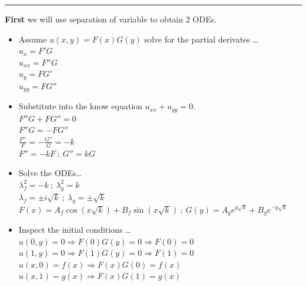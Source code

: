 \documentclass[10pt]{article}
\begin{document}
\hrule

\vspace{7.5mm}

\noindent
\textbf{First} we will use separation of variable to obtain 2 ODEs. \\

\begin{itemize}
    \item Assume $ \displaystyle u(x,y) = F(x)G(y) $ solve for the partial derivates \dots \\
    \subitem $ \displaystyle u_{x} = F'G $ \\
    \subitem $ \displaystyle u_{xx} = F''G $ \\
    \subitem $ \displaystyle u_{y} = FG' $ \\
    \subitem $ \displaystyle u_{yy} = FG'' $ \\
    \item Substitute into the know equation $ \displaystyle u_{xx} + u_{yy} = 0 $. \\
    \subitem $ \displaystyle F''G + FG'' = 0 $ \\
    \subitem $ \displaystyle F''G = - FG''$ \\
    \subitem $ \displaystyle \frac{F''}{F} =  - \frac{G''}{G} = -k $ \\
    \subitem $ \displaystyle F'' = -kF \ ; \ G'' = kG $ \\
    \item Solve the ODEs\dots \\
    \subitem $ \displaystyle \lambda_{f}^2 = -k \ ; \ \lambda_{g}^2 = k $ \\
    \subitem $ \displaystyle \lambda_{f} = \pm i \sqrt{k} \ ; \ \lambda_{g} = \pm \sqrt{k} $ \\
    \subitem $ \displaystyle F(x) = A_{f}\cos{(x\sqrt{k})} + B_{f}\sin{(x\sqrt{k})} \ ; \ G(y) = A_{g}e^{y\sqrt{k}} + B_{g}e^{-y\sqrt{k}} $ \\
    \item Inspect the initial conditions \dots \\
    \subitem $ \displaystyle u(0,y) = 0 \Rightarrow F(0)G(y) = 0 \Rightarrow F(0) = 0 $ \\
    \subitem $ \displaystyle u(1,y) = 0 \Rightarrow F(1)G(y) = 0 \Rightarrow F(1) = 0 $ \\
    \subitem $ \displaystyle u(x,0) = f(x) \Rightarrow F(x)G(0) = f(x) $ \\
    \subitem $ \displaystyle u(x,1) = g(x) \Rightarrow F(x)G(1) = g(x) $ \\

\end{itemize}
\end{document}

